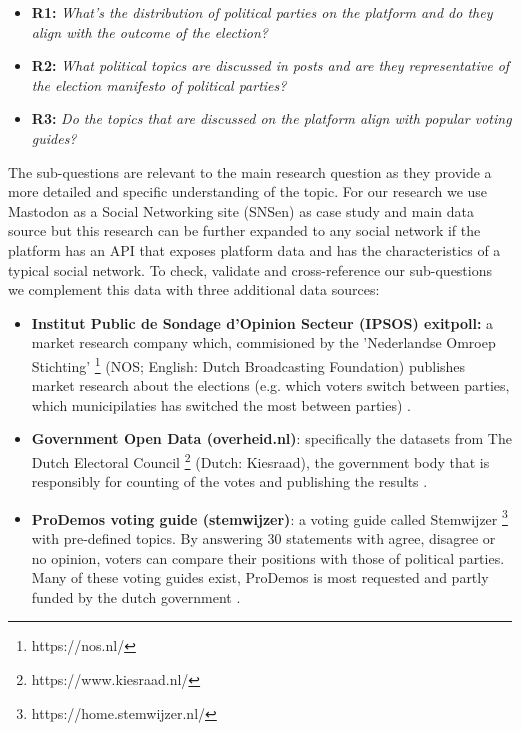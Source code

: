 \begin{itemize}
  \item \textbf{R1:} \textit{What's the distribution of political parties on the platform and do they align with the outcome of the election? }
  \item \textbf{R2:} \textit{What political topics are discussed in posts and are they representative of the election manifesto of political parties? }
  \item \textbf{R3:} \textit{Do the topics that are discussed on the platform align with popular voting guides?}
\end{itemize}

The sub-questions are relevant to the main research question as they provide a more detailed and specific understanding of the topic. For our research we use Mastodon as a Social Networking site (SNSen) as case study and main data source but this research can be further expanded to any social network if the platform has an API that exposes platform data and has the characteristics of a typical social network. To check, validate and cross-reference our sub-questions we complement this data with three additional data sources: 

\begin{itemize}
  \item \textbf{Institut Public de Sondage d'Opinion Secteur (IPSOS) exitpoll:} a market research company which, commisioned by the 'Nederlandse Omroep Stichting' \footnote{https://nos.nl/} (NOS; English: Dutch Broadcasting Foundation) publishes market research about the elections (e.g. which voters switch between parties, which municipilaties has switched the most between parties) \cite{nos}.
  \item \textbf{Government Open Data (overheid.nl)}: specifically the datasets from The Dutch Electoral Council \footnote{https://www.kiesraad.nl/} (Dutch: Kiesraad), the government body that is responsibly for counting of the votes and publishing the results \cite{kiesraad}.
  \item \textbf{ProDemos voting guide (stemwijzer)}: a voting guide called Stemwijzer \footnote{https://home.stemwijzer.nl/} with pre-defined topics. By answering 30 statements with agree, disagree or no opinion, voters can compare their positions with those of political parties. Many of these voting guides exist, ProDemos is most requested and partly funded by the dutch government \cite{prodemos}.
\end{itemize}
